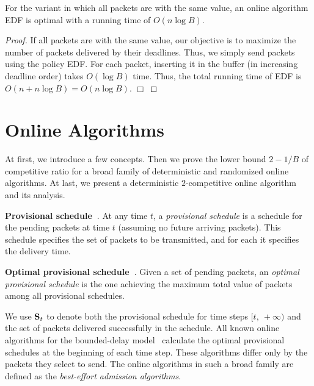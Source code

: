\documentclass[final, 11pt]{article}
\begin{document}
\begin{corollary}
For the variant in which all packets are with the same value, an online algorithm EDF is optimal with a running time of $O(n \log B)$.
\end{corollary}

\begin{proof}
If all packets are with the same value, our objective is to maximize the number of packets delivered by their deadlines. Thus, we simply send packets using the policy EDF. For each packet, inserting it in the buffer (in increasing deadline order) takes $O(\log B)$ time. Thus, the total running time of EDF is $O(n + n \log B) = O(n \log B)$. $\Box$
\end{proof}



\section{Online Algorithms}
\label{sec:online}

At first, we introduce a few concepts. Then we prove the lower bound $2 - 1 / B$ of competitive ratio for a broad family of deterministic and randomized online algorithms. At last, we present a deterministic $2$-competitive online algorithm and its analysis.

\begin{Definition}
{\bf Provisional schedule~\cite{CJST07a, EW07}}. At any time $t$, a {\em provisional schedule} is a schedule for the pending packets at time $t$ (assuming no future arriving packets). This schedule specifies the set of packets to be transmitted, and for each it specifies the delivery time.
\end{Definition}

\begin{Definition}
{\bf Optimal provisional schedule~\cite{CJST07a, EW07}}. Given a set of pending packets, an {\em optimal provisional schedule} is the one achieving the maximum total value of packets among all provisional schedules.
\end{Definition}

We use ${\bf S}_t$ to denote both the provisional schedule for time steps $[t, \ +\infty)$ and the set of packets delivered successfully in the schedule. All known online algorithms for the bounded-delay model~\cite{LSS05, CJST07, LSS07, EW07} calculate the optimal provisional schedules at the beginning of each time step. These algorithms differ only by the packets they select to send. The online algorithms in such a broad family are defined as the {\em best-effort admission algorithms}.
\end{document}
